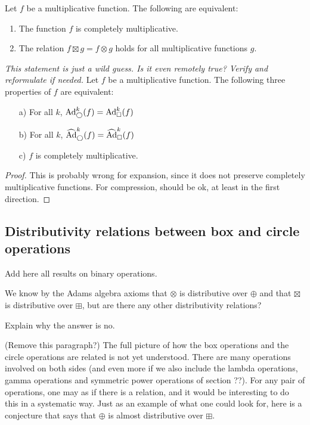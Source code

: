 \begin{proposition}
Let $f$ be a multiplicative function. The following are equivalent:
\begin{enumerate}
\item The function $f$ is completely multiplicative.
\item The relation $f \boxtimes g = f \otimes g$ holds for all multiplicative functions $g$. 
\end{enumerate}
\end{proposition}



\begin{proposition}
\emph{This statement is just a wild guess. Is it even remotely true? Verify and reformulate if needed.}
Let $f$ be a multiplicative function. The following three properties of $f$ are equivalent:
\begin{itemize}
\item[a)] For all $k$, $\text{Ad}^{k}_{\bigcirc}(f) = \text{Ad}^{k}_{\square}(f)$
\item[b)] For all $k$, $\widehat{\text{Ad}}^{k}_{\bigcirc}(f) = \widehat{\text{Ad}}^{k}_{\square}(f)$
\item[c)] $f$ is completely multiplicative.
\end{itemize}
\end{proposition}
\begin{proof}
This is probably wrong for expansion, since it does not preserve completely multiplicative functions. For compression, should be ok, at least in the first direction.
\end{proof}


\subsection{Distributivity relations between box and circle operations}

Add here all results on binary operations.

We know by the Adams algebra axioms that $\otimes$ is distributive over $\oplus$ and that $\boxtimes$ is distributive over $\boxplus$, but are there any other distributivity relations? 

Explain why the answer is no.

(Remove this paragraph?) The full picture of how the box operations and the circle operations are related is not yet understood. There are many operations involved on both sides (and even more if we also include the lambda operations, gamma operations and symmetric power operations of section ??). For any pair of operations, one may as if there is a relation, and it would be interesting to do this in a systematic way. Just as an example of what one could look for, here is a conjecture that says that $\oplus$ is almost distributive over $\boxplus$.

